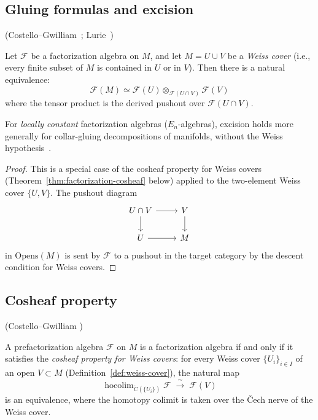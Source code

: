\subsection{Gluing formulas and excision}

\begin{theorem}
\label{thm:excision-factorization}
\textup{(Costello--Gwilliam~\cite[§6.3]{CG17}; Lurie~\cite[Theorem~5.5.3.11]{HA})}

Let $\mathcal{F}$ be a factorization algebra on $M$, and let
$M = U \cup V$ be a \emph{Weiss cover} (i.e., every finite subset of $M$ is contained in $U$ or in $V$). Then there is a natural equivalence:
\[\mathcal{F}(M) \simeq \mathcal{F}(U) \otimes_{\mathcal{F}(U \cap V)} \mathcal{F}(V)\]
where the tensor product is the derived pushout over $\mathcal{F}(U \cap V)$.

For \emph{locally constant} factorization algebras ($E_n$-algebras), excision holds more generally for collar-gluing decompositions of manifolds, without the Weiss hypothesis~\cite[Theorem~5.5.3.11]{HA}.
\end{theorem}

\begin{proof}
This is a special case of the cosheaf property for Weiss covers
(Theorem~\ref{thm:factorization-cosheaf} below) applied to the
two-element Weiss cover $\{U, V\}$. The pushout diagram
\[\begin{tikzcd}
U \cap V \arrow[r] \arrow[d] & V \arrow[d] \\
U \arrow[r] & M
\end{tikzcd}\]
in $\mathrm{Opens}(M)$ is sent by $\mathcal{F}$ to a pushout in the target
category by the descent condition for Weiss covers.
\end{proof}

\subsection{Cosheaf property}

\begin{theorem}
\label{thm:factorization-cosheaf}
\textup{(Costello--Gwilliam \cite[Theorem~6.3.1]{CG17})}

A prefactorization algebra $\mathcal{F}$ on $M$ is a factorization algebra
if and only if it satisfies the \emph{cosheaf property for Weiss covers}:
for every Weiss cover $\{U_i\}_{i \in I}$ of an open $V \subset M$
(Definition~\ref{def:weiss-cover}), the natural map
\[\operatorname{hocolim}_{\check{C}(\{U_i\})}
 \mathcal{F} \;\xrightarrow{\;\sim\;}\; \mathcal{F}(V)\]
is an equivalence, where the homotopy colimit is taken over the
\v{C}ech nerve of the Weiss cover.
\end{theorem}


